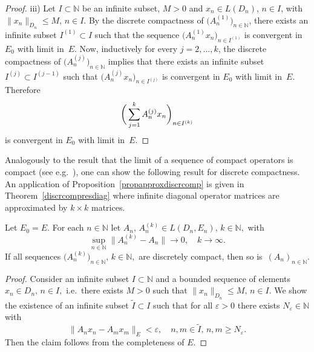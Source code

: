 \documentclass[a4paper,reqno]{amsart}
\begin{document}
{\begin{proof}
iii) Let $I\subset{\mathbb{N}}$ be an infinite subset, $M>0$ and $x_n\in L(D_n)$, $n\in I$, with  $\|x_n\|_{D_n}\leq M$, $n\in I$. 
By the discrete compactness of $\big(A_n^{(1)}\big)_{n\in{\mathbb{N}}}$, there exists an infinite subset  $I^{(1)}\subset I$ such that the sequence $\big(A_n^{(1)}x_n\big)_{n\in I^{(1)}}$ is  convergent in $E_0$ with limit in~$E$.
Now, inductively for every $j=2,\dots,k$, the discrete compactness of $\big(A_n^{(j)}\big)_{n\in{\mathbb{N}}}$ implies that there exists an infinite subset $I^{(j)}\subset I^{(j-1)}$ such that $\big(A_n^{(j)}x_n\big)_{n\in I^{(j)}}$ is  convergent in $E_0$ with limit in~$E$.
Therefore \vspace{-1mm}
$$\bigg(\sum_{j=1}^k A_n^{(j)}x_n\bigg)_{n\in I^{(k)}}\vspace{-1mm}$$ is convergent in $E_0$ with limit in~$E$. 
\end{proof}

Analogously to the result that the limit of a sequence of compact operators is compact (see e.g.\ \cite[Theorem III.4.7]{kato}), one can show the following result for discrete compactness.
An application of Proposition~\ref{propapproxdiscrcomp} is given in Theorem~\ref{discrcompresdiag} where infinite diagonal operator matrices are approximated by $k\times k$ matrices. 
\begin{prop}
Let $E_0=E$. 
For each $n\in{\mathbb{N}}$ let $A_n, \,A_n^{(k)}\in L(D_n,E_n), \,k\in{\mathbb{N}},$ with 
\begin{equation} \sup_{n\in{\mathbb{N}}}\big\|A_n^{(k)}- A_n\big\|{\longrightarrow} 0, \quad k\to\infty.\label{eq.unif.conv}\end{equation}
If all sequences $\big(A_n^{(k)}\big)_{n\in{\mathbb{N}}}, \,k\in{\mathbb{N}},$ are discretely compact, then so is~$(A_n)_{n\in{\mathbb{N}}}$.
\label{propapproxdiscrcomp}
\end{prop}

\begin{proof}
Consider an infinite subset $I\subset{\mathbb{N}}$ and a bounded sequence of elements $x_n\in D_n, \,n\in I,$ i.e.\ there exists $M>0$ such that $\|x_n\|_{D_n}\leq M, \,n\in I$. 
 We show the existence of an infinite subset $\widetilde I\subset I$ such that for all $\varepsilon>0$ there exists $N_\varepsilon\in{\mathbb{N}}$ with 
 $$\|A_nx_n-A_mx_m\|_{E}<\varepsilon, \quad n,m\in \widetilde I, \,n,m\geq N_\varepsilon.$$
 Then the claim follows from the completeness of $E$.
 

\end{proof}}
\end{document}

